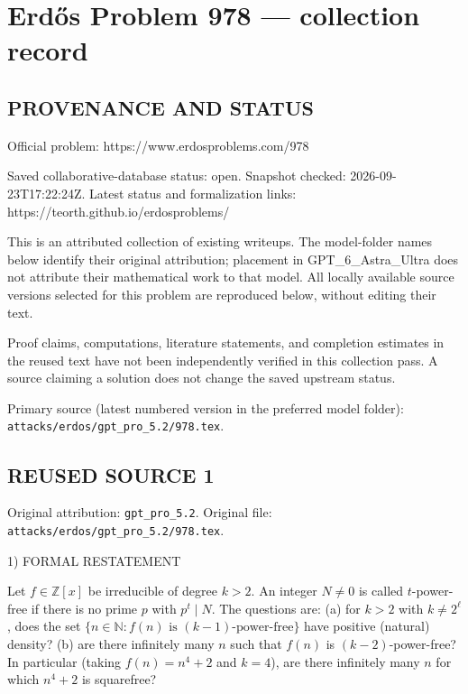 \section*{Erd\H{o}s Problem 978 --- collection record}

\subsection*{PROVENANCE AND STATUS}
Official problem: https://www.erdosproblems.com/978

Saved collaborative-database status: open.
Snapshot checked: 2026-09-23T17:22:24Z.
Latest status and formalization links: https://teorth.github.io/erdosproblems/

This is an attributed collection of existing writeups. The model-folder names below identify their original attribution; placement in GPT\_6\_Astra\_Ultra does not attribute their mathematical work to that model. All locally available source versions selected for this problem are reproduced below, without editing their text.

Proof claims, computations, literature statements, and completion estimates in the reused text have not been independently verified in this collection pass. A source claiming a solution does not change the saved upstream status.

Primary source (latest numbered version in the preferred model folder): \texttt{attacks/erdos/gpt\_pro\_5.2/978.tex}.

\subsection*{REUSED SOURCE 1}
Original attribution: \texttt{gpt\_pro\_5.2}.
Original file: \texttt{attacks/erdos/gpt\_pro\_5.2/978.tex}.


1) FORMAL RESTATEMENT

Let $f\in\mathbb Z[x]$ be irreducible of degree $k>2$.
An integer $N\ne 0$ is called $t$-power-free if there is no prime $p$ with $p^t\mid N$.
The questions are:
(a) for $k>2$ with $k\ne 2^\ell$, does the set $\{n\in\mathbb N: f(n)\text{ is }(k-1)\text{-power-free}\}$ have positive (natural) density?
(b) are there infinitely many $n$ such that $f(n)$ is $(k-2)$-power-free?
In particular (taking $f(n)=n^4+2$ and $k=4$), are there infinitely many $n$ for which $n^4+2$ is squarefree?

